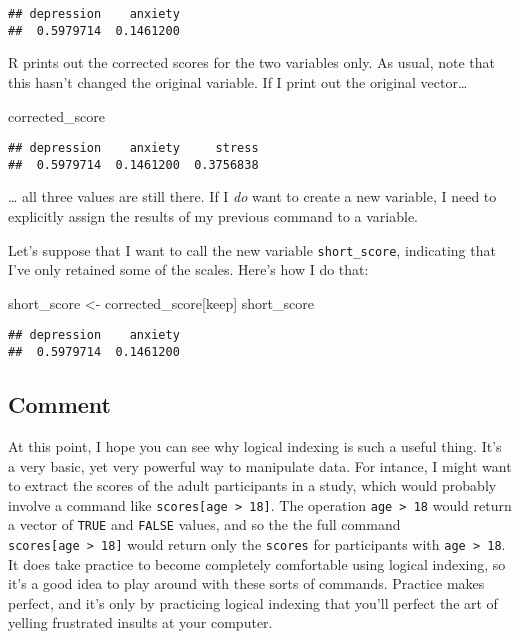 \documentclass[]{book}
\newenvironment{Shaded}{\begin{snugshade}}{\end{snugshade}}
\newcommand{\NormalTok}[1]{#1}
\newcommand{\StringTok}[1]{\textcolor[rgb]{0.31,0.60,0.02}{#1}}
\begin{document}
\begin{verbatim}
## depression    anxiety 
##  0.5979714  0.1461200
\end{verbatim}

R prints out the corrected scores for the two variables only. As usual, note that this hasn't changed the original variable. If I print out the original vector\ldots{}

\begin{Shaded}
\begin{Highlighting}[]
\NormalTok{corrected_score}
\end{Highlighting}
\end{Shaded}

\begin{verbatim}
## depression    anxiety     stress 
##  0.5979714  0.1461200  0.3756838
\end{verbatim}

\ldots{} all three values are still there. If I \emph{do} want to create a new variable, I need to explicitly assign the results of my previous command to a variable.

Let's suppose that I want to call the new variable \texttt{short\_score}, indicating that I've only retained some of the scales. Here's how I do that:

\begin{Shaded}
\begin{Highlighting}[]
\NormalTok{short_score <-}\StringTok{ }\NormalTok{corrected_score[keep]}
\NormalTok{short_score}
\end{Highlighting}
\end{Shaded}

\begin{verbatim}
## depression    anxiety 
##  0.5979714  0.1461200
\end{verbatim}

\hypertarget{comment}{%
\subsection{Comment}\label{comment}}

At this point, I hope you can see why logical indexing is such a useful thing. It's a very basic, yet very powerful way to manipulate data. For intance, I might want to extract the scores of the adult participants in a study, which would probably involve a command like \texttt{scores{[}age\ \textgreater{}\ 18{]}}. The operation \texttt{age\ \textgreater{}\ 18} would return a vector of \texttt{TRUE} and \texttt{FALSE} values, and so the the full command \texttt{scores{[}age\ \textgreater{}\ 18{]}} would return only the \texttt{scores} for participants with \texttt{age\ \textgreater{}\ 18}. It does take practice to become completely comfortable using logical indexing, so it's a good idea to play around with these sorts of commands. Practice makes perfect, and it's only by practicing logical indexing that you'll perfect the art of yelling frustrated insults at your computer.
\end{document}
